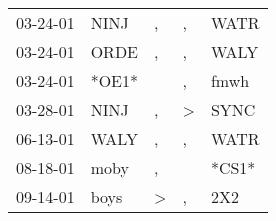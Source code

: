 \begin{supertabular}{lllll}
 03-24-01 &   NINJ &             , &             , &   WATR \\
 03-24-01 &   ORDE &             , &             , &   WALY \\
 03-24-01 &  *OE1* &               &             , &   fmwh \\
 03-28-01 &   NINJ &             , &  \textgreater &   SYNC \\
 06-13-01 &   WALY &             , &             , &   WATR \\
 08-18-01 &   moby &             , &               &  *CS1* \\
 09-14-01 &   boys &  \textgreater &             , &    2X2 \\
\end{supertabular}
